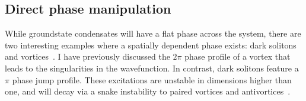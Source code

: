 {


\subsection{Direct phase manipulation}\label{sec:phase}

While groundstate condensates will have a flat phase across the system, there are two interesting examples where a spatially dependent phase exists: dark solitons~\cite{BEC:Denschlag_science_2000} and vortices~\cite{Vtx:Dobrek_pra_1999}. I have previously discussed the $2\pi$ phase profile of a vortex that leads to the singularities in the wavefunction. In contrast, dark solitons feature a $\pi$ phase jump profile. These excitations are unstable in dimensions higher than one, and will decay via a snake instability to paired vortices and antivortices~\cite{BEC:Brand_pra_2002}. %

}
